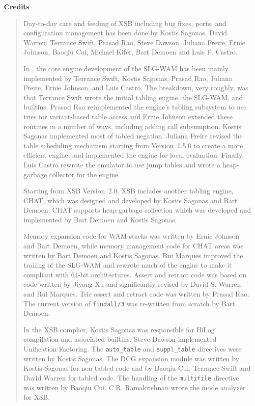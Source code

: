 \begin{center}
{\bf {\Large 
		Credits
}}
\end{center}


\begin{quote}
Day-to-day care and feeding of XSB including bug fixes, ports, and
configuration management has been done by Kostis Sagonas, David
Warren, Terrance Swift, Prasad Rao, Steve Dawson, Juliana Freire,
Ernie Johnson, Baoqiu Cui, Michael Kifer, Bart Demoen and Luis F.
Castro.

In \version, the core engine development of the SLG-WAM has been
mainly implemented by Terrance Swift, Kostis Sagonas, Prasad Rao,
Juliana Freire, Ernie Johnson, and Luis Castro.  The breakdown,
very roughly, was that Terrance Swift wrote the initial tabling
engine, the SLG-WAM, and builtins.  Prasad Rao reimplemented the
engine's tabling subsystem to use tries for variant-based table access
and Ernie Johnson extended these routines in a number of ways,
including adding call subsumption.  Kostis Sagonas implemented most of
tabled negation.  Juliana Freire revised the table scheduling
mechanism starting from Version~1.5.0 to create a more efficient
engine, and implemented the engine for local evaluation.  Finally,
Luis Castro rewrote the emulator to use jump tables and wrote a
heap-garbage collector for the engine.

Starting from XSB Version~2.0, XSB includes another tabling engine,
CHAT, which was designed and developed by Kostis Sagonas and Bart
Demoen.  CHAT supports heap garbage collection which was developed and
implemented by Bart Demoen and Kostis Sagonas.

Memory expansion code for WAM stacks was written by Ernie Johnson and
Bart Demoen, while memory management code for CHAT areas was written
by Bart Demoen and Kostis Sagonas.  Rui Marques improved the trailing
of the SLG-WAM and rewrote much of the engine to make it compliant
with 64-bit architectures.  Assert and retract code was based on code
written by Jiyang Xu and significantly revised by David S. Warren and
Rui Marques.  Trie assert and retract code was written by Prasad Rao.
The current version of {\tt findall/3} was re-written from scratch by
Bart Demoen.  

In the XSB complier, Kostis Sagonas was responsible for HiLog
compilation and associated builtins.  Steve Dawson implemented
Unification Factoring.  The {\tt auto\_table} and {\tt suppl\_table}
directives were written by Kostis Sagonas.  The DCG expansion module
was written by Kostis Sagonas for non-tabled code and by Baoqiu Cui,
Terrance Swift and David Warren for tabled code.  The handling of the
{\tt multifile} directive was written by Baoqiu Cui. C.R. Ramakrishnan
wrote the mode analyzer for XSB.


\end{quote}

